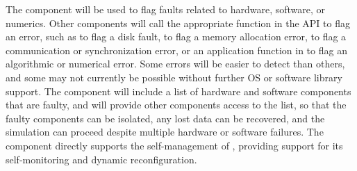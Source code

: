 \documentclass[11pt,letterpaper]{article}
\begin{document}
The  component will be used to flag faults related to
hardware, software, or numerics.  Other components will call the
appropriate function in the  API to flag an error, such as
 to flag a disk fault,  to flag a memory
allocation error,  to flag a communication or
synchronization error, or an application function in  to
flag an algorithmic or numerical error.  Some errors will be easier to
detect than others, and some may not currently be possible without
further OS or software library support.  The  component
will include a list of hardware and software components that are
faulty, and will provide other components access to the list, so that
the faulty components can be isolated, any lost data can be recovered,
and the simulation can proceed despite multiple hardware or software
failures.  The  component directly supports the self-management
of \cello, providing support for its self-monitoring and dynamic reconfiguration.

\end{document}
